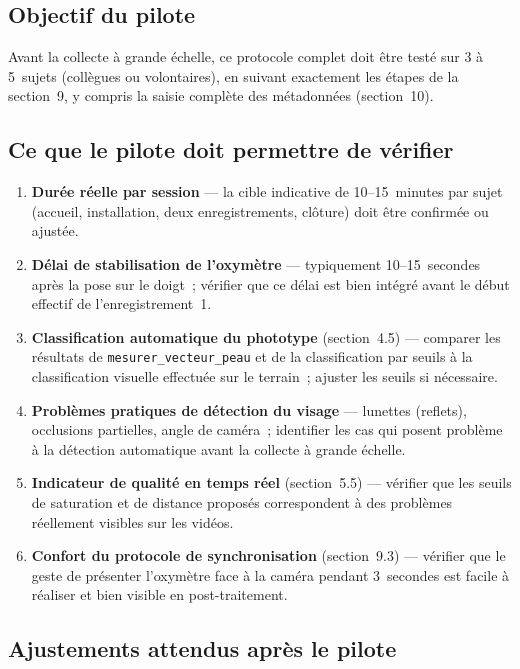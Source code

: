 \documentclass[11pt,a4paper]{article}
\begin{document}
\subsection{Objectif du pilote}

Avant la collecte \`a grande \'echelle, ce protocole complet doit \^etre
test\'e sur 3 \`a 5~sujets (coll\`egues ou volontaires), en suivant
exactement les \'etapes de la section~9, y compris la saisie compl\`ete des
m\'etadonn\'ees (section~10).

\subsection{Ce que le pilote doit permettre de v\'erifier}

\begin{enumerate}
\item \textbf{Dur\'ee r\'eelle par session} --- la cible indicative de
10--15~minutes par sujet (accueil, installation, deux enregistrements,
cl\^oture) doit \^etre confirm\'ee ou ajust\'ee.
\item \textbf{D\'elai de stabilisation de l'oxym\`etre} --- typiquement
10--15~secondes apr\`es la pose sur le doigt~; v\'erifier que ce d\'elai est
bien int\'egr\'e avant le d\'ebut effectif de l'enregistrement~1.
\item \textbf{Classification automatique du phototype} (section~4.5) ---
comparer les r\'esultats de \texttt{mesurer\_vecteur\_peau} et de la
classification par seuils \`a la classification visuelle effectu\'ee sur le
terrain~; ajuster les seuils si n\'ecessaire.
\item \textbf{Probl\`emes pratiques de d\'etection du visage} --- lunettes
(reflets), occlusions partielles, angle de cam\'era~; identifier les cas qui
posent probl\`eme \`a la d\'etection automatique avant la collecte \`a grande
\'echelle.
\item \textbf{Indicateur de qualit\'e en temps r\'eel} (section~5.5) ---
v\'erifier que les seuils de saturation et de distance propos\'es
correspondent \`a des probl\`emes r\'eellement visibles sur les vid\'eos.
\item \textbf{Confort du protocole de synchronisation} (section~9.3) ---
v\'erifier que le geste de pr\'esenter l'oxym\`etre face \`a la cam\'era
pendant 3~secondes est facile \`a r\'ealiser et bien visible en
post-traitement.
\end{enumerate}

\subsection{Ajustements attendus apr\`es le pilote}
\end{document}
